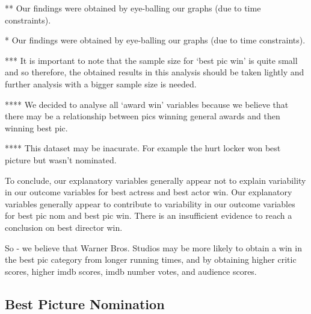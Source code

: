 \documentclass[12pt,letterpaper]{article}
\begin{document}
\begin{itemize}
	\begin{center}
		** Our findings were obtained by eye-balling our graphs (due to time constraints). 
	\end{center}

\item** Our findings were obtained by eye-balling our graphs (due to time constraints). 
	\vspace{1cm}

	\begin{center}
		
	 *** It is important to note that the sample size for ‘best pic win’ is quite small and so therefore, the obtained results in this analysis should be taken lightly and further analysis with a bigger sample size is needed. 
	 \end{center}
 
	\vspace{1cm}
	\begin{center}
		**** We decided to analyse all ‘award win’ variables because we believe that there may be a relationship between pics winning general awards and then winning best pic. 
		\vspace{1cm}
	\end{center}

\begin{center}

	\item 
	**** This dataset may be inacurate. For example the hurt locker won best picture but wasn't nominated. 
	
\end{center}
	\vspace{1cm}
To conclude, our explanatory variables generally appear not to explain variability in our outcome variables for best actress and best actor win. Our explanatory variables generally appear to contribute to variability in our outcome variables for best pic nom and best pic win. There is an insufficient evidence to reach a conclusion on best director win. 


So - we believe that Warner Bros. Studios may be more likely to obtain a win in the best pic category from longer running times, and by obtaining higher critic scores, higher imdb scores, imdb number votes, and audience scores. 
	
	\vspace{1cm}
	\end{itemize}

\newpage
			
\subsection*{Best Picture Nomination}
\end{document}
